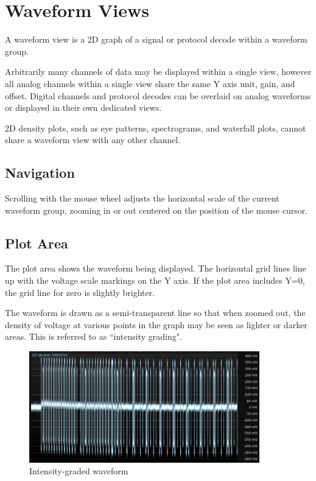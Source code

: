 \chapter{Waveform Views}

A waveform view is a 2D graph of a signal or protocol decode within a waveform group.

Arbitrarily many channels of data may be displayed within a single view, however all analog channels within a single
view share the same Y axis unit, gain, and offset. Digital channels and protocol decodes can be overlaid on analog
waveforms or displayed in their own dedicated views.

2D density plots, such as eye patterns, spectrograms, and waterfall plots, cannot share a waveform view
with any other channel.

\section{Navigation}

Scrolling with the mouse wheel adjusts the horizontal scale of the current waveform group, zooming in or out centered
on the position of the mouse cursor.



\section{Plot Area}

The plot area shows the waveform being displayed. The horizontal grid lines line up with the voltage scale markings on
the Y axis. If the plot area includes Y=0, the grid line for zero is slightly brighter.

The waveform is drawn as a semi-transparent line so that when zoomed out, the density of voltage at various points in
the graph may be seen as lighter or darker areas. This is referred to as ``intensity grading".

\begin{figure}[H]
\centering
\includegraphics[width=10cm]{ng-images/graded-waveform.png}
\caption{Intensity-graded waveform}
\label{graded-waveform2}
\end{figure}

